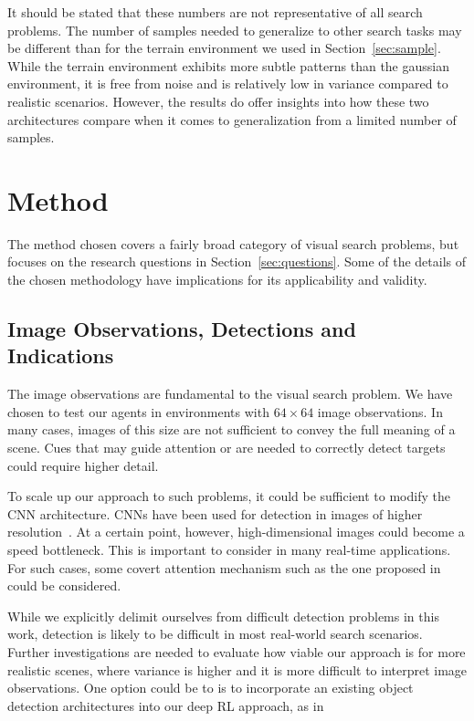 It should be stated that these numbers are not representative of all search problems.
The number of samples needed to generalize to other search tasks may be different than for the terrain environment we used in Section~\ref{sec:sample}.
While the terrain environment exhibits more subtle patterns than the gaussian environment, it is free from noise and is relatively low in variance compared to realistic scenarios.
However, the results do offer insights into how these two architectures compare when it comes to generalization from a limited number of samples.

\section{Method}
\label{sec:discussion-method}

The method chosen covers a fairly broad category of visual search problems,
but focuses on the research questions in Section~\ref{sec:questions}.
Some of the details of the chosen methodology have implications for its applicability and validity.

\subsection{Image Observations, Detections and Indications}

The image observations are fundamental to the visual search problem.
We have chosen to test our agents in environments with \(64 \times 64\) image observations.
In many cases, images of this size are not sufficient to convey the full meaning of a scene.
Cues that may guide attention or are needed to correctly detect targets could require higher detail.

To scale up our approach to such problems, it could be sufficient to modify the CNN architecture.
CNNs have been used for detection in images of higher resolution~\cite{zhao_object_2019}.
At a certain point, however, high-dimensional images could become a speed bottleneck.
This is important to consider in many real-time applications.
For such cases, some covert attention mechanism such as the one proposed in~\cite{mnih_recurrent_2014} could be considered.

While we explicitly delimit ourselves from difficult detection problems in this work,
detection is likely to be difficult in most real-world search scenarios.
Further investigations are needed to evaluate how viable our approach is for more realistic scenes,
where variance is higher and it is more difficult to interpret image observations.
One option could be to is to incorporate an existing object detection architectures into our deep RL approach, as in \cite{ye_active_2018}

